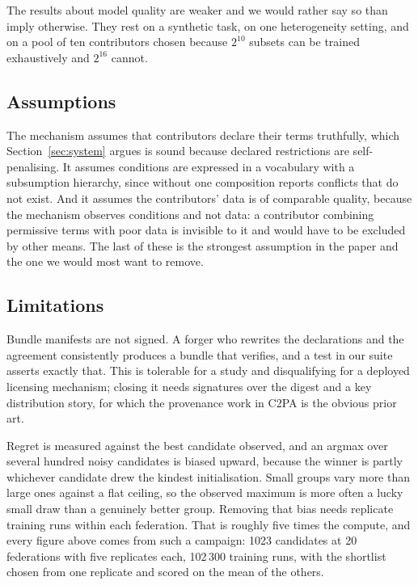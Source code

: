 \documentclass[10pt,conference]{IEEEtran}
\begin{document}
The results about model quality are weaker and we would rather say so than
imply otherwise. They rest on a synthetic task, on one heterogeneity setting,
and on a pool of ten contributors chosen because $2^{10}$ subsets can be trained
exhaustively and $2^{16}$ cannot.

\subsection{Assumptions}

The mechanism assumes that contributors declare their terms truthfully, which
Section~\ref{sec:system} argues is sound because declared restrictions are
self-penalising. It assumes conditions are expressed in a vocabulary with a
subsumption hierarchy, since without one composition reports conflicts that do
not exist. And it assumes the contributors' data is of comparable quality,
because the mechanism observes conditions and not data: a contributor
combining permissive terms with poor data is invisible to it and would have to
be excluded by other means. The last of these is the strongest assumption in the
paper and the one we would most want to remove.

\subsection{Limitations}

Bundle manifests are not signed. A forger who rewrites the declarations and the
agreement consistently produces a bundle that verifies, and a test in our suite
asserts exactly that. This is tolerable for a study and disqualifying for a
deployed licensing mechanism; closing it needs signatures over the digest and a
key distribution story, for which the provenance work in C2PA is the obvious
prior art.

Regret is measured against the best candidate observed, and an argmax over
several hundred noisy candidates is biased upward, because the winner is partly
whichever candidate drew the kindest initialisation. Small groups vary more than
large ones against a flat ceiling, so the observed maximum is more often a lucky
small draw than a genuinely better group. Removing that bias needs replicate
training runs within each federation. That is roughly five times the compute,
and every figure above comes from such a campaign: 1023 candidates at 20
federations with five replicates each, 102\,300 training runs, with the
shortlist chosen from one replicate and scored on the mean of the others.
\end{document}
